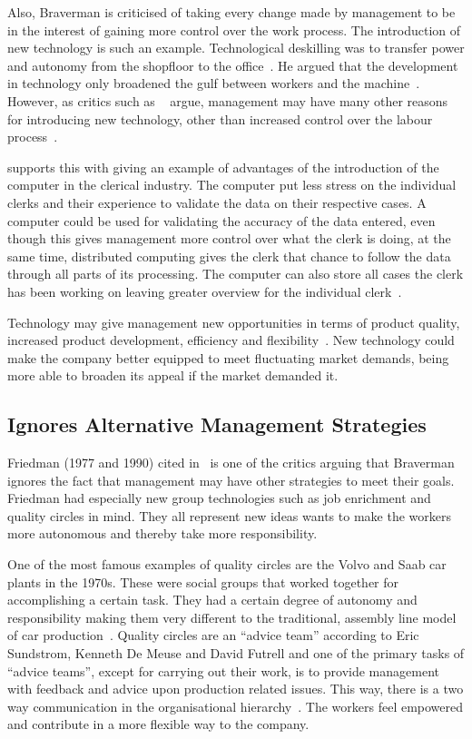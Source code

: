 \documentclass[a4paper,12pt,titlepage]{article}
\begin{document}
  Also, Braverman is criticised of taking every change made
  by management to be in the interest of gaining more control
  over the work process. The introduction of new technology is such
  an example. Technological deskilling
  was to transfer power and autonomy from the shopfloor to the
  office~\cite[151]{hb}. He argued that the development
  in technology only broadened the gulf
  between workers and the machine~\cite[230-232]{hb}. However, as
  critics such as ~\cite{bglm} argue, management may have many other
  reasons for introducing new technology, other than increased control
  over the labour process~\cite[206-207]{bglm}.

  \cite{rcsr} supports this with giving an example of advantages
  of the introduction of the computer in the clerical industry. The
  computer put less stress on the individual clerks and their
  experience to validate the data on their respective cases. A computer
  could be used for validating the accuracy of the data entered, even
  though this gives management more control over what the clerk is doing,
  at the same time, distributed computing gives the clerk that chance
  to follow the data through all parts of its processing. The computer
  can also store all cases the clerk has been working on leaving
  greater overview for the individual clerk~\cite[177-179]{rcsr}.
  
  Technology may give management new opportunities in
  terms of product quality, increased product development, efficiency and
  flexibility~\cite[155]{mnpb}. New technology could make the
  company better equipped to meet fluctuating market demands, being
  more able to broaden its appeal if the market demanded it.

  \subsection{Ignores Alternative Management Strategies}
  Friedman (1977 and 1990) cited in~\cite{mnpb} is one of the critics
  arguing that Braverman ignores the fact that management may have other
  strategies to meet their goals. Friedman had especially new group
  technologies such as job enrichment and quality circles in mind. They all
  represent new ideas wants to make the workers more autonomous and
  thereby take more responsibility.
  
  One of the most famous examples of quality circles are the
  Volvo and Saab car plants in the 1970s. These were social groups
  that worked together for accomplishing a certain task. They
  had a certain degree of autonomy and responsibility making them
  very different to the traditional, assembly line model of
  car production~\cite[32-65]{mcc}. Quality circles are an
  ``advice team'' according to Eric Sundstrom,
  Kenneth De Meuse and David Futrell and one of the primary
  tasks of ``advice teams'',
  except for carrying out their work, is to provide management
  with feedback and advice upon production related issues. This
  way, there is a two way communication in the organisational
  hierarchy~\cite[380-381]{ahdb}. The workers feel empowered
  and contribute in a more flexible way to the company. 
\end{document}
